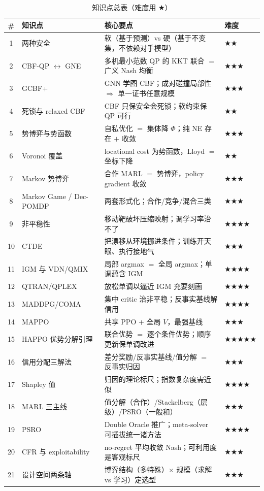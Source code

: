 \begin{table}[H]\centering\small
\caption{知识点总表（难度用 \texorpdfstring{$\bigstar$}{star}）}
\begin{tabular}{clll}
\toprule
\# & 知识点 & 核心要点 & 难度 \\
\midrule
1 & 两种安全 & 软（基于预测）vs 硬（基于不变集，不依赖对手模型） & \(\bigstar\bigstar\) \\
2 & CBF-QP $\leftrightarrow$ GNE & 多机最小范数 QP 的 KKT 联合 $=$ 广义 Nash 均衡 & \(\bigstar\bigstar\bigstar\) \\
3 & GCBF+ & GNN 学图 CBF；成对碰撞局部性 $\Rightarrow$ 单一证书任意规模 & \(\bigstar\bigstar\bigstar\) \\
4 & 死锁与 relaxed CBF & CBF 只保安全会死锁；软约束保 QP 可行 & \(\bigstar\bigstar\) \\
5 & 势博弈与势函数 & 自私优化 $=$ 集体降 $\Phi$；纯 NE 存在 $+$ 收敛 & \(\bigstar\bigstar\bigstar\) \\
6 & Voronoi 覆盖 & locational cost 为势函数，Lloyd $=$ 坐标下降 & \(\bigstar\bigstar\) \\
7 & Markov 势博弈 & 合作 MARL $=$ 势博弈，policy gradient 收敛 & \(\bigstar\bigstar\bigstar\) \\
8 & Markov Game / Dec-POMDP & 两套形式化；合作/竞争/混合三类 & \(\bigstar\bigstar\bigstar\) \\
9 & 非平稳性 & 移动靶破坏压缩映射；调学习率治不了 & \(\bigstar\bigstar\bigstar\bigstar\) \\
10 & CTDE & 把漂移从环境挪进条件；训练开天眼、执行接地气 & \(\bigstar\bigstar\bigstar\) \\
11 & IGM 与 VDN/QMIX & 局部 argmax $=$ 全局 argmax；单调蕴含 IGM & \(\bigstar\bigstar\bigstar\bigstar\) \\
12 & QTRAN/QPLEX & 放松单调以逼近 IGM 充要刻画 & \(\bigstar\bigstar\bigstar\bigstar\) \\
13 & MADDPG/COMA & 集中 critic 治非平稳；反事实基线解信用 & \(\bigstar\bigstar\bigstar\bigstar\) \\
14 & MAPPO & 共享 PPO $+$ 全局 $V$，最强基线 & \(\bigstar\bigstar\bigstar\) \\
15 & HAPPO 优势分解引理 & 联合优势 $=$ 逐个条件优势；顺序更新保单调改进 & \(\bigstar\bigstar\bigstar\bigstar\bigstar\) \\
16 & 信用分配三解法 & 差分奖励/反事实基线/值分解 $=$ 反事实归因 & \(\bigstar\bigstar\bigstar\) \\
17 & Shapley 值 & 归因的理论标尺；指数复杂度需近似 & \(\bigstar\bigstar\bigstar\bigstar\) \\
18 & MARL 三主线 & 值分解（合作）/Stackelberg（层级）/PSRO（一般和） & \(\bigstar\bigstar\bigstar\) \\
19 & PSRO & Double Oracle 推广；meta-solver 可插拔统一诸方法 & \(\bigstar\bigstar\bigstar\bigstar\) \\
20 & CFR 与 exploitability & no-regret 平均收敛 Nash；可利用度是客观标尺 & \(\bigstar\bigstar\bigstar\) \\
21 & 设计空间两条轴 & 博弈结构（多特殊）$\times$ 规模（求解 vs 学习）定选型 & \(\bigstar\bigstar\bigstar\) \\
\bottomrule
\end{tabular}
\end{table}

